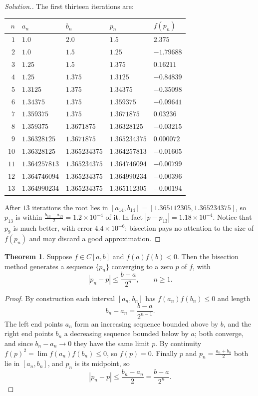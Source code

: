 \documentclass[11pt,a4paper]{article}
\numberwithin{equation}{section}
\theoremstyle{definition}
\newtheorem{thm}{Theorem}[subsection]
\newenvironment{solution}
  {\renewcommand{\qedsymbol}{}\begin{proof}[\textit{Solution}.]}
  {\end{proof}}
\begin{document}
\begin{solution}
The first thirteen iterations are:
\begin{center}
\begin{tabular}{rllll}
\hline
$n$ & $a_n$ & $b_n$ & $p_n$ & $f(p_n)$\\
\hline
$1$ & $1.0$ & $2.0$ & $1.5$ & $2.375$\\
$2$ & $1.0$ & $1.5$ & $1.25$ & $-1.79688$\\
$3$ & $1.25$ & $1.5$ & $1.375$ & $0.16211$\\
$4$ & $1.25$ & $1.375$ & $1.3125$ & $-0.84839$\\
$5$ & $1.3125$ & $1.375$ & $1.34375$ & $-0.35098$\\
$6$ & $1.34375$ & $1.375$ & $1.359375$ & $-0.09641$\\
$7$ & $1.359375$ & $1.375$ & $1.3671875$ & $0.03236$\\
$8$ & $1.359375$ & $1.3671875$ & $1.36328125$ & $-0.03215$\\
$9$ & $1.36328125$ & $1.3671875$ & $1.365234375$ & $0.000072$\\
$10$ & $1.36328125$ & $1.365234375$ & $1.364257813$ & $-0.01605$\\
$11$ & $1.364257813$ & $1.365234375$ & $1.364746094$ & $-0.00799$\\
$12$ & $1.364746094$ & $1.365234375$ & $1.364990234$ & $-0.00396$\\
$13$ & $1.364990234$ & $1.365234375$ & $1.365112305$ & $-0.00194$\\
\hline
\end{tabular}
\end{center}
After $13$ iterations the root lies in $[a_{14},b_{14}] = [1.365112305, 1.365234375]$, so $p_{13}$ is within $\frac{b_{13}-a_{13}}{2} =
1.2\times10^{-4}$ of it. In fact $|p-p_{13}| = 1.18\times10^{-4}$. Notice that $p_9$ is much better, with error $4.4\times10^{-6}$: bisection
pays no attention to the size of $f(p_n)$ and may discard a good approximation.
\end{solution}

\begin{thm}
\label{thm:bisection}
Suppose $f\in C[a,b]$ and $f(a)f(b)<0$. Then the bisection method generates a sequence $\{p_n\}$ converging to a zero $p$ of $f$, with
$$|p_n-p|\leq\frac{b-a}{2^n},\qquad n\geq1 .$$
\end{thm}

\begin{proof}
By construction each interval $[a_n,b_n]$ has $f(a_n)f(b_n)\leq0$ and length
$$b_n-a_n = \frac{b-a}{2^{n-1}} .$$
The left end points $a_n$ form an increasing sequence bounded above by $b$, and the right end points $b_n$ a decreasing sequence bounded
below by $a$; both converge, and since $b_n-a_n\longrightarrow0$ they have the same limit $p$. By continuity
$f(p)^2 = \lim f(a_n)f(b_n)\leq0$, so $f(p) = 0$. Finally $p$ and $p_n = \frac{a_n+b_n}{2}$ both lie in $[a_n,b_n]$, and $p_n$ is its
midpoint, so
$$|p_n-p|\leq\frac{b_n-a_n}{2} = \frac{b-a}{2^n}.$$
\end{proof}
\end{document}
